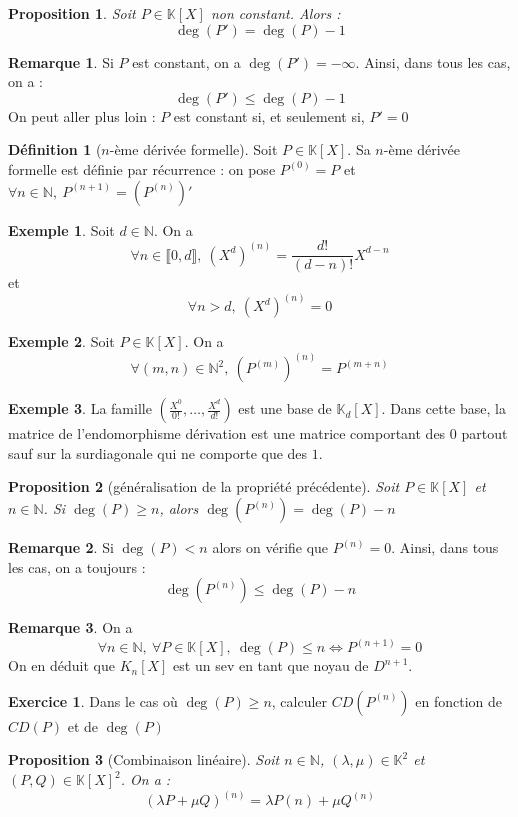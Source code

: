 \documentclass[french]{book}
\newcommand{\N}{\mathbb{N}}
\newcommand{\K}{\mathbb{K}}
\theoremstyle{plain}
\newtheorem{prop}{Proposition}[chapter]
\theoremstyle{definition}
\newtheorem{dfn}{Définition}[chapter]
\newtheorem{exa}{Exemple}[chapter]
\newtheorem{rmq}{Remarque}[chapter]
\newtheorem{exe}{Exercice}[chapter]
\theoremstyle{remark}
\begin{document}
\begin{prop}
	Soit $P\in\K[X]$ non constant. Alors : $$\deg(P')=\deg(P)-1$$
\end{prop}
\begin{rmq}
	Si $P$ est constant, on a $\deg(P')=-\infty$. Ainsi, dans tous les cas, on a : $$\deg(P')\leqslant\deg(P)-1$$ On peut aller plus loin : $P$ est constant si, et seulement si, $P'=0$
\end{rmq}
\begin{dfn}[$n$-ème dérivée formelle]
	Soit $P\in\K[X]$. Sa $n$-ème dérivée formelle est définie par récurrence : on pose $P^{(0)}=P$ et $\forall n\in\N,\ P^{(n+1)}=(P^{(n)})'$
\end{dfn}
\begin{exa}
	Soit $d\in\N$. On a $$\forall n\in\llbracket0,d\rrbracket,\ (X^d)^{(n)}=\frac{d!}{(d-n)!}X^{d-n}$$ et $$\forall n>d,\ (X^d)^{(n)}=0$$
\end{exa}
\begin{exa}
	Soit $P\in\K[X]$. On a $$\forall (m,n)\in\N^2,\ (P^{(m)})^{(n)}=P^{(m+n)}$$
\end{exa}
\begin{exa}
	La famille $\displaystyle\left(\frac{X^0}{0!},\ldots,\frac{X^d}{d!}\right)$ est une base de $\K_d[X]$. Dans cette base, la matrice de l'endomorphisme dérivation est une matrice comportant des $0$ partout sauf sur la surdiagonale qui ne comporte que des $1$.
\end{exa}
\begin{prop}[généralisation de la propriété précédente]
	Soit $P\in\K[X]$ et $n\in\N$. Si $\deg(P)\geqslant n$, alors $\deg(P^{(n)})=\deg(P)-n$
\end{prop}
\begin{rmq}
	Si $\deg(P)<n$ alors on vérifie que $P^{(n)}=0$. Ainsi, dans tous les cas, on a toujours : $$\deg(P^{(n)})\leqslant\deg(P)-n$$
\end{rmq}
\begin{rmq}
	On a $$\forall n\in\N,\ \forall P\in\K[X],\ \deg(P)\leqslant n \Longleftrightarrow P^{(n+1)}=0$$ On en déduit que $K_n[X]$ est un sev en tant que noyau de $D^{n+1}$.
\end{rmq}
\begin{exe}
	Dans le cas où $\deg(P)\geqslant n$, calculer $CD(P^{(n)})$ en fonction de $CD(P)$ et de $\deg(P)$
\end{exe}
\begin{prop}[Combinaison linéaire]
	Soit $n\in\N$, $(\lambda,\mu)\in\K^2$ et $(P,Q)\in\K[X]^2$. On a : $$(\lambda P+\mu Q)^{(n)}=\lambda P{(n)}+\mu Q^{(n)}$$
\end{prop}
\end{document}
